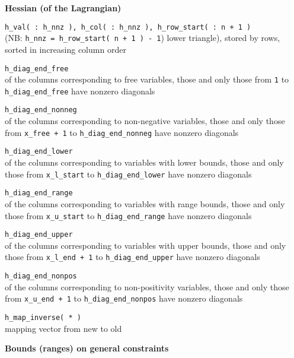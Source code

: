 \documentclass[twoside]{article}
\newcommand{\alist}[2]{\begin{#1}{#2}\end{#1}}
\newcommand{\dlist}[1]{\alist{description}{#1}}
\newcommand{\header}[1]{\vspace{5mm}

\noindent
\textbf{\large {#1}}}
\begin{document}
\clearpage

\header{Hessian (of the Lagrangian)}
 
\dlist{
\item[{\tt h\_val( : h\_nnz ), h\_col( : h\_nnz ), h\_row\_start( : n + 1 )}] 
 \mbox{} \\
    (NB: {\tt h\_nnz = h\_row\_start( n + 1 ) - 1})
     lower triangle), stored by rows, sorted in increasing column order
\item[{\tt h\_diag\_end\_free}] \mbox{} \\
     of the columns corresponding to free variables, those and only those 
     from {\tt 1} to {\tt h\_diag\_end\_free} have nonzero diagonals
\item[{\tt h\_diag\_end\_nonneg}] \mbox{} \\
     of the columns corresponding to non-negative variables, those and only 
     those from {\tt x\_free + 1} to {\tt h\_diag\_end\_nonneg} have nonzero 
     diagonals
\item[{\tt h\_diag\_end\_lower}] \mbox{} \\
     of the columns corresponding to variables with lower bounds, those and 
     only those from 
     {\tt x\_l\_start} to {\tt h\_diag\_end\_lower} have nonzero diagonals
\item[{\tt h\_diag\_end\_range}] \mbox{} \\
     of the columns corresponding to variables with range bounds, those and 
     only those from 
     {\tt x\_u\_start} to {\tt h\_diag\_end\_range} have nonzero diagonals
\item[{\tt h\_diag\_end\_upper}] \mbox{} \\
     of the columns corresponding to variables with upper bounds, those and 
     only those from 
     {\tt x\_l\_end + 1} to {\tt h\_diag\_end\_upper} have nonzero diagonals
\item[{\tt h\_diag\_end\_nonpos}] \mbox{} \\
     of the columns corresponding to non-positivity variables, those and only 
     those from 
     {\tt x\_u\_end + 1} to {\tt h\_diag\_end\_nonpos} have nonzero diagonals
\item[{\tt h\_map\_inverse( * )}] \mbox{} \\
     mapping vector from new to old
}

\header{Bounds (ranges) on general constraints}
\end{document}
